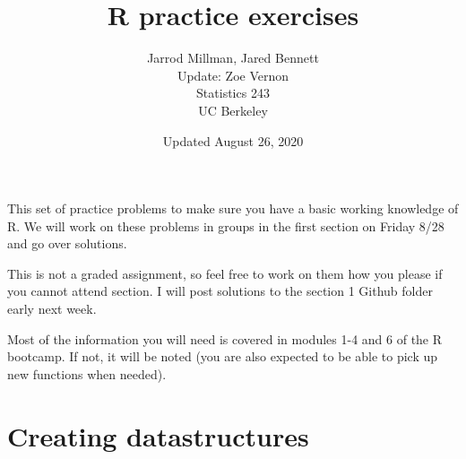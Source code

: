 \documentclass{article}
\title{R practice exercises}
\date{Updated August 26, 2020}
\author{Jarrod Millman, Jared Bennett\\ Update: Zoe Vernon\\ Statistics 243\\ UC Berkeley}
\begin{document}
\maketitle

This set of practice problems to make sure you have a
basic working knowledge of R.  We will work on these problems in groups in the first section on Friday 8/28 and go over solutions. 

This is not a graded assignment, so feel free to work on them how you please if you cannot attend section.  I will post solutions to the section 1 Github folder early next week. 

Most of the information you will need is covered in modules 1-4 and 6 of the R
bootcamp.  If not, it will be noted (you are also expected to be able to pick
up new functions when needed).


\section*{Creating datastructures}
\end{document}
